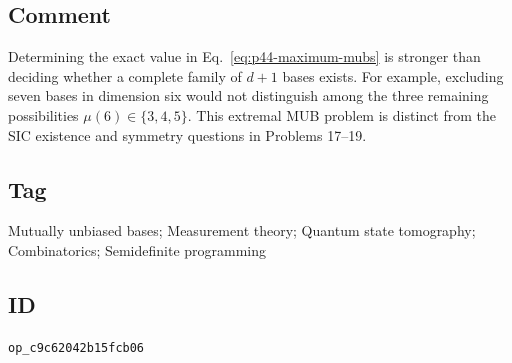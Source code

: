 \subsection*{Comment}

Determining the exact value in Eq.~\eqref{eq:p44-maximum-mubs} is stronger
than deciding whether a complete family of $d+1$ bases exists.  For example,
excluding seven bases in dimension six would not distinguish among the three
remaining possibilities $\mu(6)\in\{3,4,5\}$.  This extremal MUB problem is
distinct from the SIC existence and symmetry questions in Problems 17--19.

\subsection*{Tag}

Mutually unbiased bases; Measurement theory; Quantum state tomography;
Combinatorics; Semidefinite programming

\subsection*{ID}

\texttt{op\_c9c62042b15fcb06}
